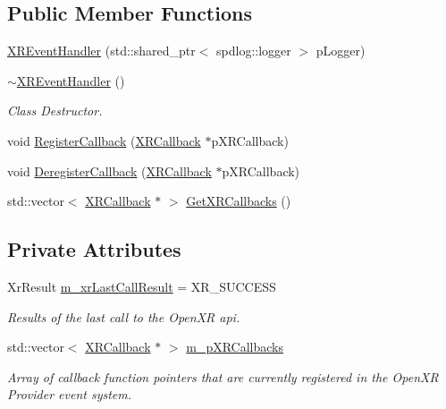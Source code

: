 \subsection*{Public Member Functions}
\begin{DoxyCompactItemize}
\item 
\mbox{\hyperlink{class_open_x_r_provider_1_1_x_r_event_handler_a9ffef59d9ec597ceecad19c3fc935ae0}{X\+R\+Event\+Handler}} (std\+::shared\+\_\+ptr$<$ spdlog\+::logger $>$ p\+Logger)
\item 
\mbox{\hyperlink{class_open_x_r_provider_1_1_x_r_event_handler_a4cc2395d94544372270850eac7eba0ff}{$\sim$\+X\+R\+Event\+Handler}} ()
\begin{DoxyCompactList}\small\item\em Class Destructor. \end{DoxyCompactList}\item 
void \mbox{\hyperlink{class_open_x_r_provider_1_1_x_r_event_handler_a027d2cf96cc56161e2db566733f984d5}{Register\+Callback}} (\mbox{\hyperlink{struct_open_x_r_provider_1_1_x_r_callback}{X\+R\+Callback}} $\ast$p\+X\+R\+Callback)
\item 
void \mbox{\hyperlink{class_open_x_r_provider_1_1_x_r_event_handler_ae64f5c0e0ab34c71a3ab3e9e3d3a3323}{Deregister\+Callback}} (\mbox{\hyperlink{struct_open_x_r_provider_1_1_x_r_callback}{X\+R\+Callback}} $\ast$p\+X\+R\+Callback)
\item 
std\+::vector$<$ \mbox{\hyperlink{struct_open_x_r_provider_1_1_x_r_callback}{X\+R\+Callback}} $\ast$ $>$ \mbox{\hyperlink{class_open_x_r_provider_1_1_x_r_event_handler_a6e6ce6065716adc4fcd6cba723fe1b0b}{Get\+X\+R\+Callbacks}} ()
\end{DoxyCompactItemize}
\subsection*{Private Attributes}
\begin{DoxyCompactItemize}
\item 
Xr\+Result \mbox{\hyperlink{class_open_x_r_provider_1_1_x_r_event_handler_a51b30482e74bc38c40482700be47da85}{m\+\_\+xr\+Last\+Call\+Result}} = X\+R\+\_\+\+S\+U\+C\+C\+E\+SS
\begin{DoxyCompactList}\small\item\em Results of the last call to the Open\+XR api. \end{DoxyCompactList}\item 
std\+::vector$<$ \mbox{\hyperlink{struct_open_x_r_provider_1_1_x_r_callback}{X\+R\+Callback}} $\ast$ $>$ \mbox{\hyperlink{class_open_x_r_provider_1_1_x_r_event_handler_ad0b2610427d3b8cff4ed01dff2baed95}{m\+\_\+p\+X\+R\+Callbacks}}
\begin{DoxyCompactList}\small\item\em Array of callback function pointers that are currently registered in the Open\+XR Provider event system. \end{DoxyCompactList}\end{DoxyCompactItemize}
